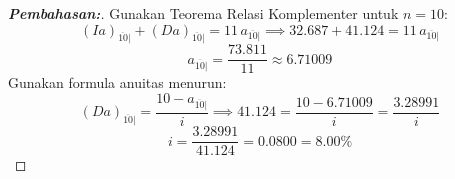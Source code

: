 \documentclass[11pt,a4paper]{article}
\begin{document}
\begin{proof}[\textbf{Pembahasan:}]
Gunakan Teorema Relasi Komplementer untuk $n = 10$:
\begin{equation*}
    (Ia)_{\overline{10}|} + (Da)_{\overline{10}|} = 11 \, a_{\overline{10}|} \implies 32.687 + 41.124 = 11 \, a_{\overline{10}|}
\end{equation*}
\begin{equation*}
    a_{\overline{10}|} = \frac{73.811}{11} \approx 6.71009
\end{equation*}
Gunakan formula anuitas menurun:
\begin{equation*}
    (Da)_{\overline{10}|} = \frac{10 - a_{\overline{10}|}}{i} \implies 41.124 = \frac{10 - 6.71009}{i} = \frac{3.28991}{i}
\end{equation*}
\begin{equation*}
    i = \frac{3.28991}{41.124} = \mathbf{0.0800} = \mathbf{8.00\%}
\end{equation*}
\end{proof}
\end{document}
